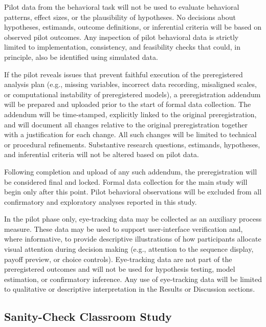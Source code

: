 \documentclass[11pt,a4paper]{article}
\numberwithin{equation}{section}
\begin{document}
Pilot data from the behavioral task will not be used to evaluate behavioral patterns, effect sizes, or the plausibility of hypotheses. No decisions about hypotheses, estimands, outcome definitions, or inferential criteria will be based on observed pilot outcomes. Any inspection of pilot behavioral data is strictly limited to implementation, consistency, and feasibility checks that could, in principle, also be identified using simulated data.

If the pilot reveals issues that prevent faithful execution of the preregistered analysis plan (e.g., missing variables, incorrect data recording, misaligned scales, or computational instability of preregistered models), a preregistration addendum will be prepared and uploaded prior to the start of formal data collection. The addendum will be time-stamped, explicitly linked to the original preregistration, and will document all changes relative to the original preregistration together with a justification for each change. All such changes will be limited to technical or procedural refinements. Substantive research questions, estimands, hypotheses, and inferential criteria will not be altered based on pilot data.

Following completion and upload of any such addendum, the preregistration will be considered final and locked. Formal data collection for the main study will begin only after this point. Pilot behavioral observations will be excluded from all confirmatory and exploratory analyses reported in this study.

In the pilot phase only, eye-tracking data may be collected as an auxiliary process measure. These data may be used to support user-interface verification and, where informative, to provide descriptive illustrations of how participants allocate visual attention during decision making (e.g., attention to the sequence display, payoff preview, or choice controls). Eye-tracking data are not part of the preregistered outcomes and will not be used for hypothesis testing, model estimation, or confirmatory inference. Any use of eye-tracking data will be limited to qualitative or descriptive interpretation in the Results or Discussion sections.


\subsection{Sanity-Check Classroom Study}
\label{Sec:Study2}
\end{document}

